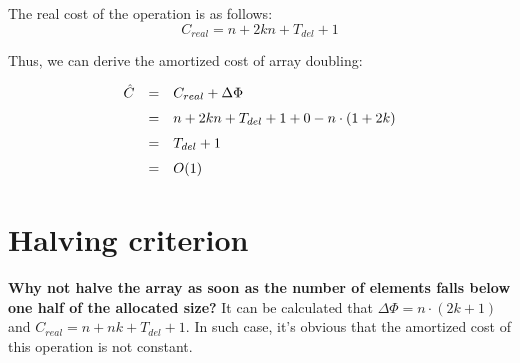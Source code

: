  The real cost of the operation is as follows:
  \[
  C_{real} = n + 2kn + T_{del} + 1
  \]

  Thus, we can derive the amortized cost of array doubling:
  \[
  \def\arraystretch{1.5}
  \begin{array}{lcl}
  \hat C & = & C_{real} + \Delta \Phi \\
         & = & n + 2kn + T_{del} + 1 + 0 - n \cdot (1 + 2k) \\
         & = & T_{del} + 1 \\
         & = & O(1)
  \end{array}
  \]

\section{Halving criterion}
  \textbf{Why not halve the array as soon as the number of elements falls below one half of the allocated size?}
  It can be calculated that $\Delta \Phi = n \cdot (2k + 1)$ and $C_{real} = n + nk + T_{del} + 1$. In such case, it's obvious that the amortized cost of this operation is not constant.
